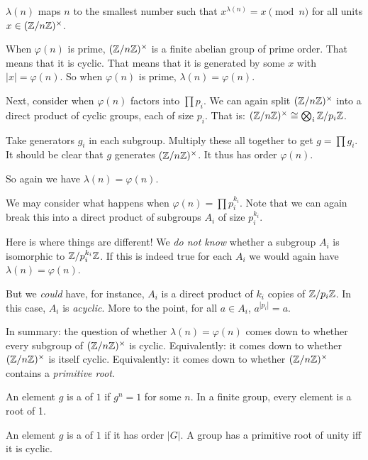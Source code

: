 \begin{definition}
   $\lambda(n)$ maps $n$ to the
  smallest number such that $x^{\lambda(n)} = x \pmod{n}$ for all units
  $x \in \mathopen{}\left( {\mathbb{Z} / n\mathbb{Z}} \right)\mathclose{}^\times$.
\end{definition}

\begin{remark}
  When $\varphi(n)$ is prime, $\mathopen{}\left( {\mathbb{Z} / n\mathbb{Z}} \right)\mathclose{}^\times$ is a finite abelian group of
  prime order. That means that it is cyclic. That means that it is
  generated by some $x$ with $|x| = \varphi(n)$. So when $\varphi(n)$ is
  prime, $\lambda(n) = \varphi(n)$.
\end{remark}

\begin{remark}
  Next, consider when $\varphi(n)$ factors into $\prod p_i$. We can
  again split $\mathopen{}\left( {\mathbb{Z} / n\mathbb{Z}} \right)\mathclose{}^\times$ into a direct product of cyclic groups, each of
  size $p_i$. That is: $\mathopen{}\left( {\mathbb{Z} / n\mathbb{Z}} \right)\mathclose{}^\times \cong \bigotimes_i \mathbb{Z} / p_i\mathbb{Z}$.

  Take generators $g_i$ in each subgroup. Multiply these all together to
  get $g = \prod g_i$. It should be clear that $g$ generates $\mathopen{}\left( {\mathbb{Z} / n\mathbb{Z}} \right)\mathclose{}^\times$.
  It thus has order $\varphi(n)$.

  So again we have $\lambda(n) = \varphi(n)$.
\end{remark}

\begin{remark}
  We may consider what happens when $\varphi(n) = \prod p_i^{k_i}$. Note
  that we can again break this into a direct product of subgroups $A_i$
  of size $p_i^{k_i}$.

  Here is where things are different! We \emph{do not know} whether a
  subgroup $A_i$ is isomorphic to $\mathbb{Z} / p_i^{k_i}\mathbb{Z}$. If this is indeed
  true for each $A_i$ we would again have $\lambda(n) = \varphi(n)$.

  But we \emph{could} have, for instance, $A_i$ is a direct product of
  $k_i$ copies of $\mathbb{Z} / p_i\mathbb{Z}$. In this case, $A_i$ is \emph{acyclic}.
  More to the point, for all $a \in A_i$, $a^{|p_i|} = a$.

  In summary: the question of whether $\lambda(n) = \varphi(n)$ comes
  down to whether every subgroup of $\mathopen{}\left( {\mathbb{Z} / n\mathbb{Z}} \right)\mathclose{}^\times$ is cyclic. Equivalently:
  it comes down to whether $\mathopen{}\left( {\mathbb{Z} / n\mathbb{Z}} \right)\mathclose{}^\times$ is itself cyclic. Equivalently: it
  comes down to whether $\mathopen{}\left( {\mathbb{Z} / n\mathbb{Z}} \right)\mathclose{}^\times$ contains a \emph{primitive root}.
\end{remark}

\begin{definition}
  An element $g$ is a  of $1$ if $g^n = 1$ for some $n$. In
  a finite group, every element is a root of 1.

  An element $g$ is a  of $1$ if it has order
  $|G|$. A group has a primitive root of unity iff it is cyclic.
\end{definition}
